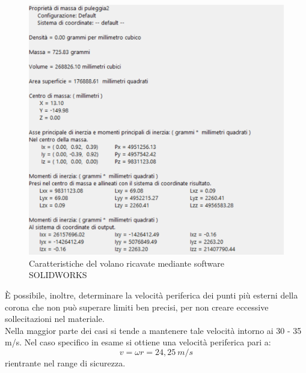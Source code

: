\begin{figure}[h]
    \centering
    \includegraphics[scale=0.5]{Immagini/CaratteristicheVolano.png}
    \caption{Caratteristiche del volano ricavate mediante software SOLIDWORKS}
    \label{fig:CaratteristicheVolano}
\end{figure}
\newpage
È possibile, inoltre, determinare la velocità periferica dei punti più esterni della corona che non può superare limiti ben precisi, per non creare eccessive sollecitazioni nel materiale.\\
Nella maggior parte dei casi si tende a mantenere tale velocità intorno ai 30 - 35 m/s. Nel caso specifico in esame si ottiene una velocità periferica pari a:
\begin{equation}
    v=\omega r=24,25\ m/s
\end{equation}
rientrante nel range di sicurezza. 
